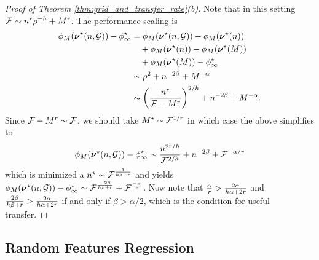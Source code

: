 \begin{proof}[Proof of Theorem \ref{thm:grid_and_transfer_rate}(b)]
    Note that in this setting $\mathcal{F} \sim n^r \rho^{-h} + M^r$. The performance scaling is
    \begin{align*}
        \phi_M(\bm{\nu}^\star(n, \mathcal{G})) - \phi_\infty^\star &= \phi_M(\bm{\nu}^\star(n, \mathcal{G})) - \phi_M(\bm{\nu}^\star(n))\\ 
        &\quad+ \phi_M(\bm{\nu}^\star(n)) - \phi_M(\bm{\nu}^\star(M))\\ 
        &\quad+ \phi_M(\bm{\nu}^\star(M)) - \phi_\infty^\star\\ 
        &\sim \rho^{2} + n^{-2\beta} + M^{-\alpha}\\
        &\sim \qty(\frac{n^r}{\mathcal{F} - M^r})^{2/h} + n^{-2\beta} + M^{-\alpha}.
    \end{align*}
    Since $\mathcal{F} - M^r \sim \mathcal{F}$, we should take $M^\star \sim \mathcal{F}^{1/r}$ in which case the above simplifies to
    \[
        \phi_M(\bm{\nu}^\star(n, \mathcal{G})) - \phi_\infty^\star \sim \frac{n^{2r / h}}{\mathcal{F}^{2 / h}}  + n^{-2\beta} + \mathcal{F}^{-\alpha/r}
    \]
    which is minimized a $n^\star \sim \mathcal{F}^{\frac{1}{h \beta + r}}$ and yields $ \phi_M(\bm{\nu}^\star(n, \mathcal{G})) - \phi_\infty^\star \sim \mathcal{F}^{\frac{-2 \beta}{h \beta + r}} + \mathcal{F}^{\frac{-\alpha}{r}}$. Now note that $\frac{\alpha}{r} > \frac{2 \alpha}{h \alpha + 2 r}$ and $\frac{2 \beta}{h \beta + r} > \frac{2\alpha}{h \alpha + 2 r}$ if and only if $\beta > \alpha / 2$, which is the condition for useful transfer.
\end{proof}

\bigskip

\subsection{Random Features Regression}
\label{app:rf-regression}

